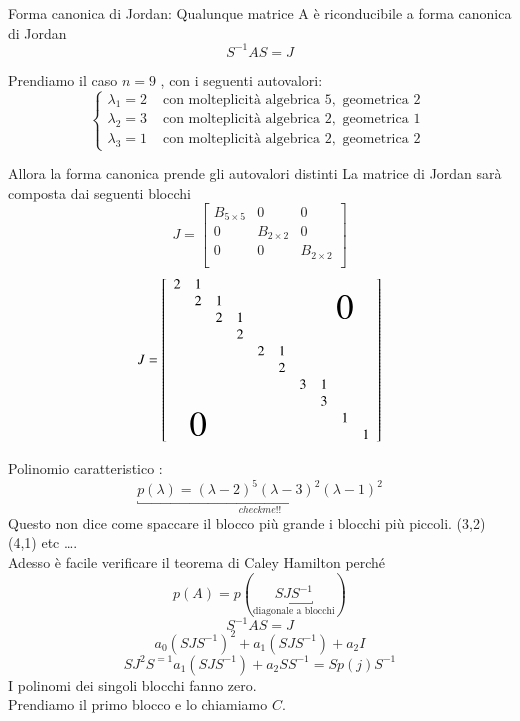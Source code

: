 Forma canonica di Jordan:
Qualunque matrice A \`e riconducibile a forma canonica di Jordan
$$S^{-1} A S =J $$
\begin{example}
Prendiamo il caso $n = 9$ , con i seguenti autovalori:
$$
\left\{
\begin{array}{cc}
 \lambda_1 = 2  & \text{ con molteplicit\`a algebrica } 5
,\text{ geometrica  2 }\\
\lambda_2 = 3   & \text{ con molteplicit\`a algebrica } 2
,\text{ geometrica  1 } \\
\lambda_3 = 1   & \text{ con molteplicit\`a algebrica } 2
,\text{ geometrica  2 } 
\end{array}
\right.
$$

Allora la forma canonica prende gli autovalori distinti
La matrice di Jordan sar\`a composta dai seguenti blocchi
$$ J =
\left[
\begin{array}{ccc}
B_{5 \times 5} & 0 & 0 \\ 
0 & B_{2 \times 2}  & 0 \\
0 & 0 & B_{2 \times 2} \\
\end{array}
\right]
$$
$$
J = 
\left[
\begin{array}{cccccccccc}
2& 1& & & & & & \multicolumn{3}{c}{\multirow{4}{*}{\Huge $0$}}
 \\
& 2 & 1 & & & & & & \\
& &2& 1 & & & & & & \\
& & & 2 & & & & & & \\
& & & &2 & 1 & & & & \\
& & & & & 2 & & & & \\
& & & & & & 3 & 1 & & \\
\multicolumn{3}{c}{\multirow{4}{*}{\Huge $0$}}
& &  & & & 3 & & \\
& & & & & & & & 1& \\
& & & & & & & & & 1 \\
\end{array}
\right]
$$

Polinomio caratteristico :
$$
\underbracket{p(\lambda) = (\lambda -2)^{5} (\lambda -3)^{2} (\lambda -1)^2}_{checkme!!}$$
Questo non dice come spaccare il blocco più grande i blocchi più piccoli.
(3,2) (4,1) etc \ldots. \\
Adesso \`e facile verificare il teorema di Caley Hamilton perch\'e
$$p(A) = p(\underbracket{SJS^{-1}}_{\text{diagonale a blocchi}})$$
$$ S^{-1} A S = J$$
$$a_0(SJS^{-1})^{2} + a_1 (SJS^{-1}) + a_2 I$$
$$ SJ^{2}S^{=1}      a_1(SJS^{-1}) + a_2 S S^{-1} = S p(j) S^{-1}$$
I polinomi dei singoli blocchi fanno zero.\\
Prendiamo il primo blocco e lo chiamiamo $C$.


\end{example}
